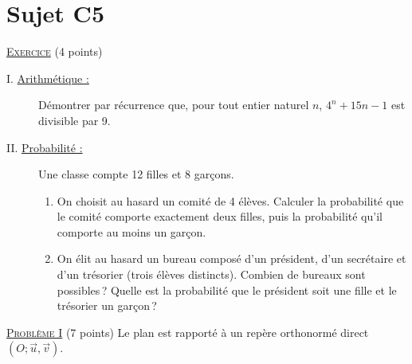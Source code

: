 \section{Sujet C5}
\noindent \underline{\textsc{Exercice}} (4 points)
\begin{description}
\item[I. \underline{Arithm\'etique :}]
      D\'emontrer par r\'ecurrence que, pour tout entier naturel $n$, $4^n + 15n - 1$ est divisible par 9.
\item[II. \underline{Probabilit\'e :}]
      Une classe compte 12 filles et 8 gar\c{c}ons.
      \begin{enumerate}
      \item On choisit au hasard un comit\'e de 4 \'el\`eves. Calculer la probabilit\'e que le comit\'e comporte exactement deux filles,
            puis la probabilit\'e qu'il comporte au moins un gar\c{c}on.
      \item On \'elit au hasard un bureau compos\'e d'un pr\'esident, d'un secr\'etaire et d'un tr\'esorier (trois \'el\`eves distincts).
            Combien de bureaux sont possibles\,? Quelle est la probabilit\'e que le pr\'esident soit une fille et le tr\'esorier un gar\c{c}on\,?
      \end{enumerate}
\end{description}

\noindent \underline{\textsc{Probl\`eme I}} (7 points) \newline
Le plan est rapport\'e \`a un rep\`ere orthonorm\'e direct $(O ; \vec{u}, \vec{v})$.

